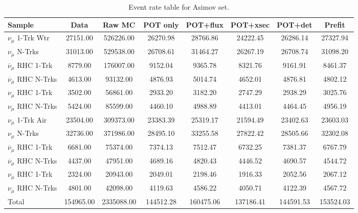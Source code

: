 \begin{table}
\begin{centering}
\begin{tabular}{lccccccc}
\toprule
Sample & Data  & Raw MC & POT only & POT+flux & POT+xsec & POT+det & Prefit \\
\midrule
\midrule
$\nu_\mu$ 1-Trk Wtr &  27151.00 &  526226.00 &  26270.98 &  28766.86 &  24222.45 &  26286.14 &  27327.94\\ 
$\nu_\mu$ N-Trks &  31013.00 &  529538.00 &  26708.61 &  31464.27 &  26267.19 &  26708.74 &  31098.20\\ 
$\overline{\nu}_\mu$ RHC 1-Trk &  8779.00 &  176007.00 &  9152.04 &  9365.78 &  8321.76 &  9161.91 &  8461.37\\ 
$\overline{\nu}_\mu$ RHC N-Trks &  4613.00 &  93132.00 &  4876.93 &  5014.74 &  4652.01 &  4876.81 &  4802.12\\ 
$\nu_\mu$ RHC 1-Trk &  3502.00 &  56861.00 &  2933.20 &  3182.20 &  2747.29 &  2938.29 &  3025.76\\ 
$\nu_\mu$ RHC N-Trks &  5424.00 &  85599.00 &  4460.10 &  4988.89 &  4413.01 &  4464.45 &  4956.19\\ 
$\nu_\mu$ 1-Trk Air &  23504.00 &  309373.00 &  23383.39 &  25319.17 &  21594.49 &  23402.63 &  23603.03\\ 
$\nu_\mu$ N-Trks &  32736.00 &  371986.00 &  28495.10 &  33255.58 &  27822.42 &  28505.66 &  32302.08\\ 
$\overline{\nu}_\mu$ RHC 1-Trk &  6681.00 &  75374.00 &  7374.13 &  7512.47 &  6732.25 &  7381.37 &  6767.79\\ 
$\overline{\nu}_\mu$ RHC N-Trks &  4437.00 &  47951.00 &  4689.16 &  4820.43 &  4446.52 &  4690.57 &  4544.72\\ 
$\nu_\mu$ RHC 1-Trk &  2324.00 &  20943.00 &  2049.01 &  2198.46 &  1916.33 &  2052.56 &  2067.12\\ 
$\nu_\mu$ RHC N-Trks &  4801.00 &  42098.00 &  4119.63 &  4586.22 &  4050.71 &  4122.39 &  4567.72\\ 
\midrule
Total &  154965.00 &  2335088.00 &  144512.28 &  160475.06 &  137186.41 &  144591.53 &  153524.03\\
\bottomrule
\end{tabular}
\end{centering}
\caption[Event Rate Table for Asimov Set]{Event rate table for Asimov set.}\label{tab:eventtable}
\end{table}

